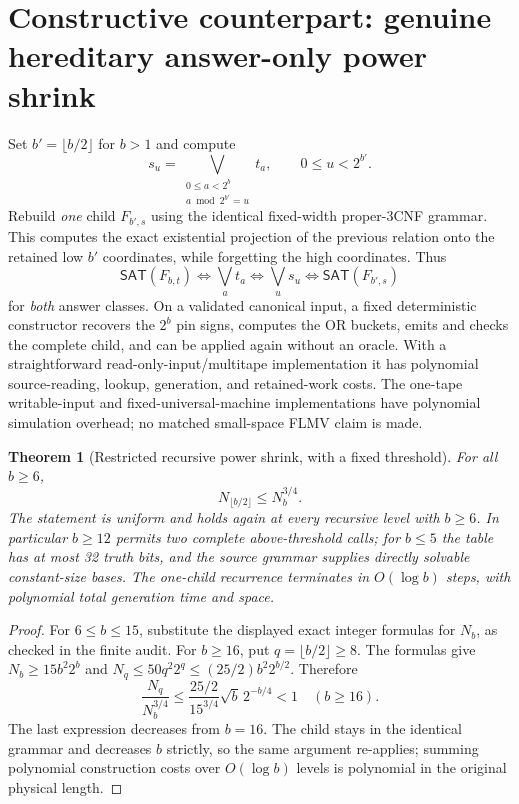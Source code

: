 \documentclass[11pt]{article}
\newtheorem{theorem}{Theorem}
\newcommand{\SAT}{\mathsf{SAT}}
\begin{document}
\section{Constructive counterpart: genuine hereditary answer-only power shrink}
Set $b'=\lfloor b/2\rfloor$ for $b>1$ and compute
\[
 s_u=\bigvee_{\substack{0\le a<2^b\\a\bmod 2^{b'}=u}}t_a,
 \qquad 0\le u<2^{b'}.
\]
Rebuild \emph{one} child $F_{b',s}$ using the identical fixed-width proper-3CNF grammar. This computes the exact existential projection of the previous relation onto the retained low $b'$ coordinates, while forgetting the high coordinates. Thus
\[
 \SAT(F_{b,t})\iff \bigvee_a t_a
 \iff\bigvee_u s_u\iff\SAT(F_{b',s})
\]
for \emph{both} answer classes. On a validated canonical input, a fixed deterministic constructor recovers the $2^b$ pin signs, computes the OR buckets, emits and checks the complete child, and can be applied again without an oracle. With a straightforward read-only-input/multitape implementation it has polynomial source-reading, lookup, generation, and retained-work costs. The one-tape writable-input and fixed-universal-machine implementations have polynomial simulation overhead; no matched small-space FLMV claim is made.

\begin{theorem}[Restricted recursive power shrink, with a fixed threshold]
For all $b\ge6$,
\[
 N_{\lfloor b/2\rfloor}\le N_b^{3/4}.
\]
The statement is uniform and holds again at every recursive level with $b\ge6$. In particular $b\ge12$ permits two complete above-threshold calls; for $b\le5$ the table has at most 32 truth bits, and the source grammar supplies directly solvable constant-size bases. The one-child recurrence terminates in $O(\log b)$ steps, with polynomial total generation time and space.
\end{theorem}
\begin{proof}
For $6\le b\le15$, substitute the displayed exact integer formulas for $N_b$, as checked in the finite audit. For $b\ge16$, put $q=\lfloor b/2\rfloor\ge8$. The formulas give $N_b\ge15b^2 2^b$ and $N_q\le50q^2 2^q\le(25/2)b^2 2^{b/2}$. Therefore
\[
 \frac{N_q}{N_b^{3/4}}\le
 \frac{25/2}{15^{3/4}}\sqrt b\,2^{-b/4}<1
 \quad(b\ge16).
\]
The last expression decreases from $b=16$. The child stays in the identical grammar and decreases $b$ strictly, so the same argument re-applies; summing polynomial construction costs over $O(\log b)$ levels is polynomial in the original physical length.\end{proof}
\end{document}
